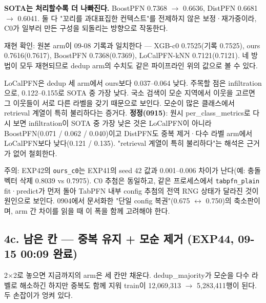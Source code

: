 \par\noindent \textbullet\enspace \textbf{SOTA는 처리할수록 더 나빠진다.} BoostPFN 0.7368  \ensuremath{\rightarrow}  0.6636, DistPFN 0.6681  \ensuremath{\rightarrow}  0.6041. 둘 다 "꼬리를 과대표집한 컨텍스트"를 전제하지 않은 보정·재가중이라, C0가 일부러 만든 구성을 되돌리는 방향으로 작동한다.


재현 확인: 원본 arm이 09-08 기록과 일치한다 — XGB-c0 0.7525(기록 0.7525), ours 0.7616(0.7617), BoostPFN 0.7368(0.7369), LoCalPFN-kNN 0.7121(0.7121). 네 방법이 모두 재현되므로 dedup arm의 수치도 같은 파이프라인 위의 값으로 볼 수 있다.

LoCalPFN은 dedup 세 arm에서 ours보다 0.037–0.064 낮다. 주목할 점은 infiltration으로, 0.122–0.155로 SOTA 중 가장 낮다. 국소 검색이 모순 지역에서 이웃을 고르면 그 이웃들이 서로 다른 라벨을 갖기 때문으로 보인다. 모순이 많은 클래스에서 retrieval 계열이 특히 불리하다는 증거다. \textbf{정정(0915)}: 원시 per\_\allowbreak{}class\_\allowbreak{}metrics로 다시 보면 infiltration이 SOTA 중 가장 낮은 것은 LoCalPFN이 아니라 BoostPFN(0.071 /\allowbreak{} 0.062 /\allowbreak{} 0.040)이고 DistPFN도 중복 제거·다수 라벨 arm에서 LoCalPFN보다 낮다(0.121 /\allowbreak{} 0.135). "retrieval 계열이 특히 불리하다"는 해석은 근거가 없어 철회한다.

주의: EXP42의 \texttt{ours\_\allowbreak{}\allowbreak{}c0}는 EXP41의 seed 42 값과 0.001–0.006 차이가 난다(예: 충돌 벡터 삭제 0.8039 vs 0.7975). C0 추첨은 동일하고, 같은 프로세스에서 \texttt{tabpfn\_\allowbreak{}\allowbreak{}p\allowbreak{}lain} fit·predict가 먼저 돌아 TabPFN 내부 config 추첨의 전역 RNG 상태가 달라진 것이 원인으로 보인다. 0904에서 문서화한 "단일 config 복권"(0.675 \ensuremath{\leftrightarrow} 0.750)의 축소판이며, arm 간 차이를 읽을 때 이 폭을 함께 고려해야 한다.

\subsection{4c. 남은 칸 — 중복 유지 +\allowbreak{} 모순 제거 (EXP44, 09-15 00:09 완료)}
2×2로 놓으면 지금까지의 arm은 세 칸만 채운다. dedup\_\allowbreak{}majority가 모순을 다수 라벨로 해소하긴 하지만 중복도 함께 지워 train이 12,069,313  \ensuremath{\rightarrow}  5,283,411행이 된다. 두 손잡이가 엉켜 있다.

